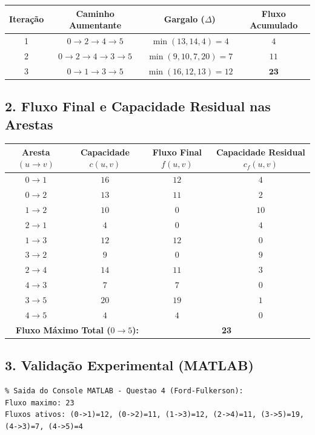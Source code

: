 \documentclass[11pt, a4paper]{article}
\begin{document}
\begin{center}
\begin{tabular}{cccc}
\toprule
\textbf{Iteração} & \textbf{Caminho Aumentante} & \textbf{Gargalo ($\Delta$)} & \textbf{Fluxo Acumulado} \\
\midrule
1 & $0 \to 2 \to 4 \to 5$ & $\min(13, 14, 4) = 4$ & $4$ \\
2 & $0 \to 2 \to 4 \to 3 \to 5$ & $\min(9, 10, 7, 20) = 7$ & $11$ \\
3 & $0 \to 1 \to 3 \to 5$ & $\min(16, 12, 13) = 12$ & $\mathbf{23}$ \\
\bottomrule
\end{tabular}
\end{center}

\subsection*{2. Fluxo Final e Capacidade Residual nas Arestas}

\begin{center}
\begin{tabular}{cccc}
\toprule
\textbf{Aresta $(u \to v)$} & \textbf{Capacidade $c(u,v)$} & \textbf{Fluxo Final $f(u,v)$} & \textbf{Capacidade Residual $c_f(u,v)$} \\
\midrule
$0 \to 1$ & $16$ & $12$ & $4$ \\
$0 \to 2$ & $13$ & $11$ & $2$ \\
$1 \to 2$ & $10$ & $0$ & $10$ \\
$2 \to 1$ & $4$ & $0$ & $4$ \\
$1 \to 3$ & $12$ & $12$ & $0$ \\
$3 \to 2$ & $9$ & $0$ & $9$ \\
$2 \to 4$ & $14$ & $11$ & $3$ \\
$4 \to 3$ & $7$ & $7$ & $0$ \\
$3 \to 5$ & $20$ & $19$ & $1$ \\
$4 \to 5$ & $4$ & $4$ & $0$ \\
\midrule
\multicolumn{2}{r}{\textbf{Fluxo Máximo Total ($0 \to 5$):}} & \multicolumn{2}{c}{\textbf{23}} \\
\bottomrule
\end{tabular}
\end{center}

\subsection*{3. Validação Experimental (MATLAB)}
\begin{lstlisting}
% Saida do Console MATLAB - Questao 4 (Ford-Fulkerson):
Fluxo maximo: 23
Fluxos ativos: (0->1)=12, (0->2)=11, (1->3)=12, (2->4)=11, (3->5)=19, (4->3)=7, (4->5)=4
\end{lstlisting}
\end{document}
